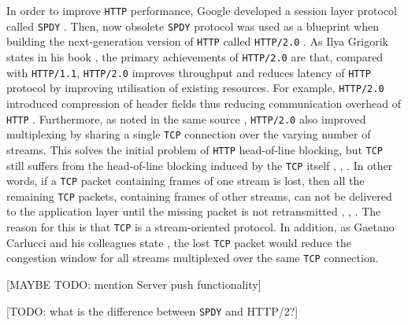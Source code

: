 \documentclass[12pt,a4paper,twoside,openright]{report}
\begin{document}
In order to improve \texttt{HTTP} performance, Google developed a session layer protocol called \texttt{SPDY} \cite{bib_SPDY_white_paper}.
Then, now obsolete \texttt{SPDY} protocol was used as a blueprint when building the next-generation version of \texttt{HTTP} called \texttt{HTTP/2.0} \cite{bib_SPDY_vs_HTTP2}.
As Ilya Grigorik states in his book \cite[Chapter~12]{bib_grigorik2013}, the primary achievements of \texttt{HTTP/2.0} are that, compared with \texttt{HTTP/1.1}, \texttt{HTTP/2.0} improves throughput and reduces latency of \texttt{HTTP} protocol by improving utilisation of existing resources.
For example, \texttt{HTTP/2.0} introduced compression of header fields thus reducing communication overhead of \texttt{HTTP} \cite[Chapter~12]{bib_grigorik2013}.
Furthermore, as noted in the same source \cite[Chapter~12]{bib_grigorik2013}, 
\texttt{HTTP/2.0} also improved multiplexing by sharing a single \texttt{TCP} connection over the varying number of streams.
This solves the initial problem of \texttt{HTTP} head-of-line blocking, but \texttt{TCP} still suffers from the head-of-line blocking induced by the \texttt{TCP} itself \cite{bib_making_web_faster_with_http2}, \cite{bib_TCP_Head_of_line_blocking_stackoverflow},
\cite{How-does-HTTP-2-solve-the-Head-of-Line-blocking-HOL-issue}.
In other words, if a \texttt{TCP} packet containing frames of one stream is lost, then all the remaining \texttt{TCP} packets, containing frames of other streams, can not be delivered to the application layer until the missing packet is not retransmitted \cite{bib_making_web_faster_with_http2}, \cite{bib_TCP_Head_of_line_blocking_stackoverflow}, 
\cite{How-does-HTTP-2-solve-the-Head-of-Line-blocking-HOL-issue}.
The reason for this is that \texttt{TCP} is a stream-oriented protocol.
In addition, as Gaetano Carlucci and his colleagues state \cite{HTTP_over_UDP_An_Experimental_Investigation_of_QUIC}, the lost \texttt{TCP} packet would reduce the congestion window for all streams multiplexed over the same \texttt{TCP} connection.



[MAYBE TODO: mention Server push functionality]

[TODO: what is the difference between \texttt{SPDY} and HTTP/2?]
\end{document}
